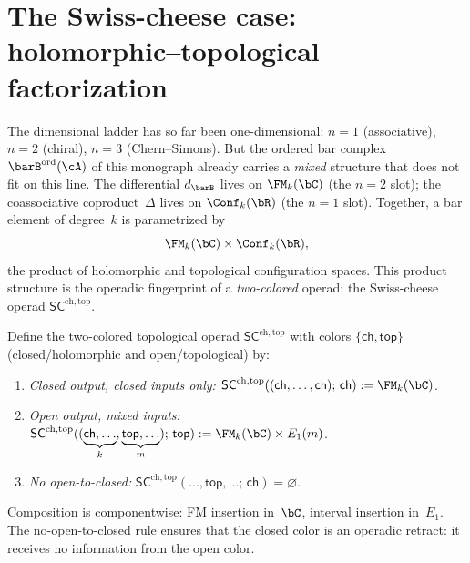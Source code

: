 

\section{The Swiss-cheese case: holomorphic--topological
factorization}
\label{sec:swiss-cheese}

The dimensional ladder has so far been one-dimensional: $n = 1$
(associative), $n = 2$ (chiral), $n = 3$ (Chern--Simons). But the
ordered bar complex $\barB^{\mathrm{ord}}(\cA)$ of this monograph
already carries a \emph{mixed}
structure that does not fit on this line. The differential
$d_{\barB}$ lives on $\FM_k(\bC)$ (the $n = 2$ slot); the
coassociative coproduct~$\Delta$ lives on $\Conf_k(\bR)$ (the
$n = 1$ slot). Together, a bar element of degree~$k$ is
parametrized by
\begin{equation}\label{eq:bar-product-space}
\FM_k(\bC) \times \Conf_k(\bR),
\end{equation}
the product of holomorphic and topological configuration spaces.
This product structure is the operadic fingerprint of a
\emph{two-colored} operad: the Swiss-cheese operad
$\mathsf{SC}^{\mathrm{ch,top}}$.

\begin{definition}
\label{def:SC}
Define the two-colored topological operad $\mathsf{SC}^{\mathrm{ch,top}}$
with colors $\{\mathsf{ch}, \mathsf{top}\}$ (closed/holomorphic
and open/topological) by:
\begin{enumerate}[label=\textup{(\roman*)}]
\item \emph{Closed output, closed inputs only:}
 $\mathsf{SC}^{\mathrm{ch,top}}
 ((\mathsf{ch},\ldots,\mathsf{ch});\, \mathsf{ch})
 := \FM_k(\bC)$.
\item \emph{Open output, mixed inputs:}
 $\mathsf{SC}^{\mathrm{ch,top}}
 ((\underbrace{\mathsf{ch},\ldots}_{k},
 \underbrace{\mathsf{top},\ldots}_{m});\, \mathsf{top})
 := \FM_k(\bC) \times E_1(m)$.
\item \emph{No open-to-closed:}
 $\mathsf{SC}^{\mathrm{ch,top}}
 (\ldots,\mathsf{top},\ldots;\, \mathsf{ch})
 = \varnothing$.
\end{enumerate}
Composition is componentwise: FM insertion in~$\bC$, interval
insertion in~$E_1$. The no-open-to-closed rule ensures that
the closed color is an operadic retract: it receives no information
from the open color.
\end{definition}


